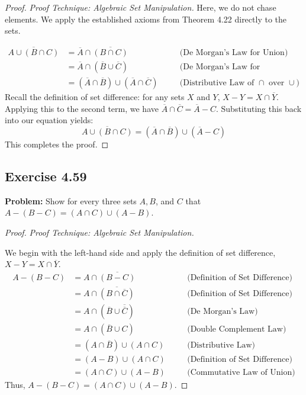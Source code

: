 \documentclass[11pt, a4paper]{article}
\theoremstyle{definition}
\theoremstyle{remark}
\begin{document}
\begin{proof}
\textit{Proof Technique: Algebraic Set Manipulation.}
Here, we do not chase elements. We apply the established axioms from Theorem 4.22 directly to the sets.

\begin{align*}
    \overline{A \cup (B \cap C)} &= \overline{A} \cap \overline{(B \cap C)} \quad &&\text{(De Morgan's Law for Union)} \\
    &= \overline{A} \cap (\overline{B} \cup \overline{C}) \quad &&\text{(De Morgan's Law for Intersection)} \\
    &= (\overline{A} \cap \overline{B}) \cup (\overline{A} \cap \overline{C}) \quad &&\text{(Distributive Law of $\cap$ over $\cup$)}
\end{align*}
Recall the definition of set difference: for any sets $X$ and $Y$, $X - Y = X \cap \overline{Y}$. 
Applying this to the second term, we have $\overline{A} \cap \overline{C} = \overline{A} - C$.
Substituting this back into our equation yields:
\[
    \overline{A \cup (B \cap C)} = (\overline{A} \cap \overline{B}) \cup (\overline{A} - C)
\]
This completes the proof.
\end{proof}

\subsection{Exercise 4.59}
\textbf{Problem:} Show for every three sets $A, B$, and $C$ that $A - (B - C) = (A \cap C) \cup (A - B)$.

\begin{proof}
\textit{Proof Technique: Algebraic Set Manipulation.}

We begin with the left-hand side and apply the definition of set difference, $X - Y = X \cap \overline{Y}$.
\begin{align*}
    A - (B - C) &= A \cap \overline{(B - C)} \quad &&\text{(Definition of Set Difference)} \\
    &= A \cap \overline{(B \cap \overline{C})} \quad &&\text{(Definition of Set Difference)} \\
    &= A \cap (\overline{B} \cup \overline{\overline{C}}) \quad &&\text{(De Morgan's Law)} \\
    &= A \cap (\overline{B} \cup C) \quad &&\text{(Double Complement Law)} \\
    &= (A \cap \overline{B}) \cup (A \cap C) \quad &&\text{(Distributive Law)} \\
    &= (A - B) \cup (A \cap C) \quad &&\text{(Definition of Set Difference)} \\
    &= (A \cap C) \cup (A - B) \quad &&\text{(Commutative Law of Union)}
\end{align*}
Thus, $A - (B - C) = (A \cap C) \cup (A - B)$.
\end{proof}
\end{document}
